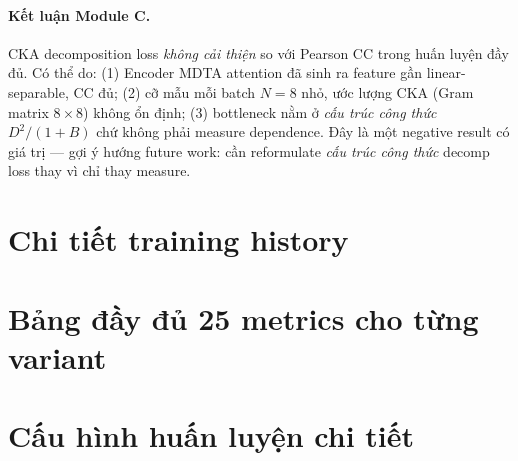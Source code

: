 \paragraph{Kết luận Module C.}
CKA decomposition loss \emph{không cải thiện} so với Pearson CC trong huấn luyện đầy đủ. Có thể do: (1) Encoder MDTA attention đã sinh ra feature gần linear-separable, CC đủ; (2) cỡ mẫu mỗi batch $N = 8$ nhỏ, ước lượng CKA (Gram matrix $8 \times 8$) không ổn định; (3) bottleneck nằm ở \emph{cấu trúc công thức} $D^2 / (1+B)$ chứ không phải measure dependence. Đây là một negative result có giá trị --- gợi ý hướng future work: cần reformulate \emph{cấu trúc công thức} decomp loss thay vì chỉ thay measure.

\section{Chi tiết training history}
\label{app:training}


\section{Bảng đầy đủ 25 metrics cho từng variant}
\label{app:metrics-full}


\section{Cấu hình huấn luyện chi tiết}
\label{app:hyperparams}

